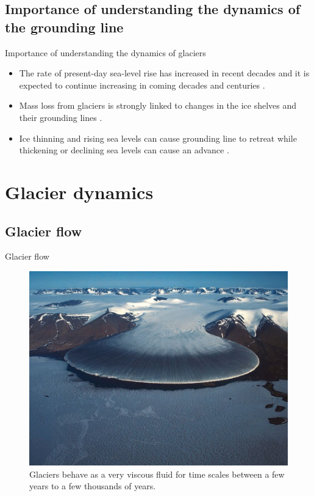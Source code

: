 \documentclass[11pt]{beamer}
\begin{document}
	\subsection{Importance of understanding the dynamics of the grounding line}
		\begin{frame}{Importance of understanding the dynamics of glaciers}
		\justifying
		\begin{itemize}
			\item The rate of present-day sea-level rise has increased in recent decades and it is expected to continue increasing in coming decades and centuries \cite[]{clark2015recent}. \pause
			\item Mass loss from glaciers is strongly linked to changes in the ice shelves and their grounding lines \cite[]{brunt2010mapping, pritchard2012antarctic}. \pause
			\item Ice thinning and rising sea levels can cause grounding line to retreat while thickening or declining sea levels can cause an advance \cite[]{friedl2020remote}.
		\end{itemize}
		\end{frame}
	\section{Glacier dynamics}
	\subsection{Glacier flow}
		\begin{frame}{Glacier flow}
		\justifying
			\begin{figure}
				\centering
				\includegraphics[scale=0.3]{../fig/glacier_flowing.png}
				\caption{Glaciers behave as a very viscous fluid for time scales between a few years to a few thousands of years. }
				\label{Flow_ice}
			\end{figure}
		\end{frame}
\end{document}
